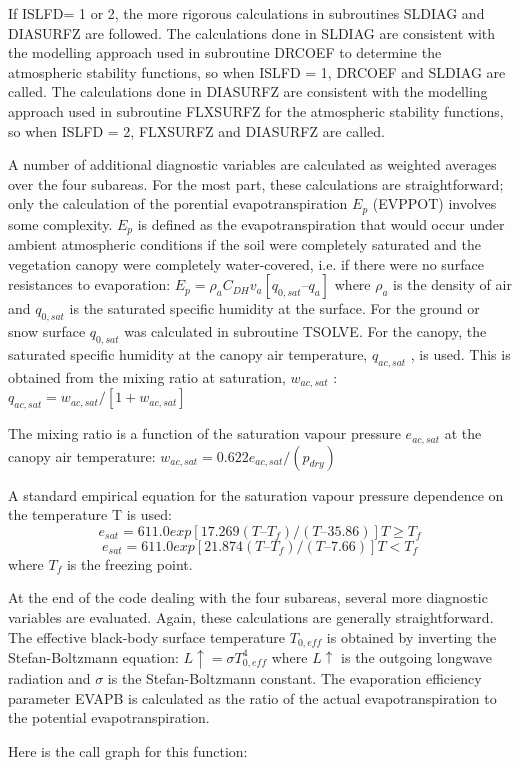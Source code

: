 If I\+S\+L\+F\+D= 1 or 2, the more rigorous calculations in subroutines S\+L\+D\+I\+A\+G and D\+I\+A\+S\+U\+R\+F\+Z are followed. The calculations done in S\+L\+D\+I\+A\+G are consistent with the modelling approach used in subroutine D\+R\+C\+O\+E\+F to determine the atmospheric stability functions, so when I\+S\+L\+F\+D = 1, D\+R\+C\+O\+E\+F and S\+L\+D\+I\+A\+G are called. The calculations done in D\+I\+A\+S\+U\+R\+F\+Z are consistent with the modelling approach used in subroutine F\+L\+X\+S\+U\+R\+F\+Z for the atmospheric stability functions, so when I\+S\+L\+F\+D = 2, F\+L\+X\+S\+U\+R\+F\+Z and D\+I\+A\+S\+U\+R\+F\+Z are called.

A number of additional diagnostic variables are calculated as weighted averages over the four subareas. For the most part, these calculations are straightforward; only the calculation of the porential evapotranspiration $E_p$ (E\+V\+P\+P\+O\+T) involves some complexity. $E_p$ is defined as the evapotranspiration that would occur under ambient atmospheric conditions if the soil were completely saturated and the vegetation canopy were completely water-\/covered, i.\+e. if there were no surface resistances to evaporation\+: $E_p = \rho_a C_{DH} v_a [q_{0,sat} – q_a ]$ where $\rho_a$ is the density of air and $q_{0,sat}$ is the saturated specific humidity at the surface. For the ground or snow surface $q_{0,sat}$ was calculated in subroutine T\+S\+O\+L\+V\+E. For the canopy, the saturated specific humidity at the canopy air temperature, $q_{ac,sat}$ , is used. This is obtained from the mixing ratio at saturation, $w_{ac,sat}$ \+: $q_{ac,sat} = w_{ac,sat} /[1 + w_{ac,sat} ]$

The mixing ratio is a function of the saturation vapour pressure $e_{ac,sat}$ at the canopy air temperature\+: $w_{ac,sat} = 0.622 e_{ac,sat} /(p_{dry} )$

A standard empirical equation for the saturation vapour pressure dependence on the temperature T is used\+: \[e_{sat} = 611.0 exp[17.269(T – T_f )/(T – 35.86)] T \geq T_f \] \[e_{sat} = 611.0 exp[21.874(T – T_f )/(T – 7.66)] T < T_f \] where $T_f$ is the freezing point.

At the end of the code dealing with the four subareas, several more diagnostic variables are evaluated. Again, these calculations are generally straightforward. The effective black-\/body surface temperature $T_{0,eff}$ is obtained by inverting the Stefan-\/\+Boltzmann equation\+: $L\uparrow = \sigma T_{0,eff}^4$ where $L\uparrow$ is the outgoing longwave radiation and $\sigma$ is the Stefan-\/\+Boltzmann constant. The evaporation efficiency parameter E\+V\+A\+P\+B is calculated as the ratio of the actual evapotranspiration to the potential evapotranspiration.

Here is the call graph for this function\+:



